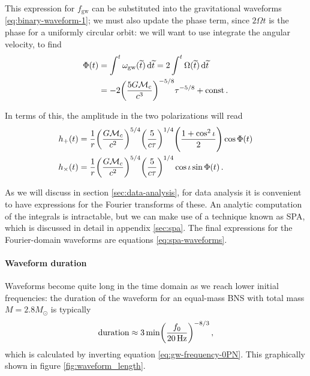 \documentclass[main.tex]{subfiles}
\begin{document}

This expression for \(f _{\text{gw}}\) can be substituted into the gravitational waveforms \eqref{eq:binary-waveform-1}; we must also update the phase term, since \(2 \Omega t\) is the phase for a uniformly circular orbit: we will want to use integrate the angular velocity, to find 
%
\begin{subequations}
\begin{align} \label{eq:phase-quadrupole-emission}
\Phi (t) &= \int^{t} \omega _{\text{gw}}(\widetilde{t}) \dd{\widetilde{t}} = 2 \int^{t} \Omega (\widetilde{t}) \dd{\widetilde{t}}  \\
&= -2 \qty(\frac{5 G \mathcal{M}_c}{c^3})^{-5/8} \tau^{-5/8} + \mathrm{const}
\,.
\end{align}
\end{subequations}

In terms of this, the amplitude in the two polarizations will read \cite[eqs.\ 4.31--32]{maggioreGravitationalWavesVolume2007}
%
\begin{subequations}
\begin{align} \label{eq:amplitude-quadrupole-emission}
h_{+} (t) &= \frac{1}{r} \qty(\frac{G \mathcal{M}_c}{c^2})^{5/4} \qty( \frac{5}{c \tau })^{1/4} \qty(\frac{1 + \cos^2\iota }{2}) \cos \Phi (t) \\
h_{ \times } (t) &= \frac{1}{r} \qty(\frac{G \mathcal{M}_c}{c^2})^{5/4} \qty( \frac{5}{c \tau })^{1/4} \cos \iota  \sin \Phi (t) 
\,.
\end{align}
\end{subequations}

As we will discuss in section \ref{sec:data-analysis}, for data analysis it is convenient to have expressions for the Fourier transforms of these. An analytic computation of the integrals is intractable, but we can make use of a technique known as \ac{SPA}, which is discussed in detail in appendix \ref{sec:spa}. 
The final expressions for the Fourier-domain waveforms are equations \eqref{eq:spa-waveforms}. 

\paragraph{Waveform duration}

Waveforms become quite long in the time domain as we reach lower initial frequencies: the duration of the waveform for an equal-mass \ac{BNS} with total mass \(M = 2.8 M_{\odot}\) is typically \cite[eq.\ 4.21]{maggioreGravitationalWavesVolume2007}
%
\begin{align} \label{eq:waveform-duration}
\text{duration} \approx \SI{3}{min} \qty(\frac{f_0 }{\SI{20}{Hz}})^{-8/3}
\,,
\end{align}
%
which is calculated by inverting equation \eqref{eq:gw-frequency-0PN}. 
This graphically shown in figure \ref{fig:waveform_length}. 
\end{document}

